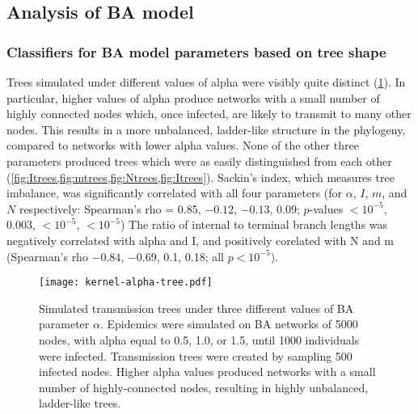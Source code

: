 \subsection{Analysis of \acrlong{BA} model}



\subsubsection*{Classifiers for BA model parameters based on tree shape}



Trees simulated under different values of \gls{alpha} were visibly quite
distinct (\cref{fig:alphatrees}). In particular, higher values of \gls{alpha}
produce networks with a small number of highly connected nodes which, once
infected, are likely to transmit to many other nodes. This results in a more
unbalanced, ladder-like structure in the phylogeny, compared to networks with
lower \gls{alpha} values. None of the other three parameters produced trees
which were as easily distinguished from each other
(\cref{fig:Itrees,fig:mtrees,fig:Ntrees,fig:Itrees}).  Sackin's index, which
measures tree imbalance, was significantly correlated with all four parameters
    (for $\alpha$, $I$, $m$, and $N$ respectively: Spearman's rho =
     0.85,
     \ensuremath{-0.12},
     \ensuremath{-0.13},
     0.09;
     $p$-values
     ${<}10^{-5}$,
     $0.003$,
     ${<}10^{-5}$,
     ${<}10^{-5}$)
The ratio of internal to terminal branch lengths was negatively correlated with
\gls{alpha} and \gls{I}, and positively corelated with \gls{N} and \gls{m}
  (Spearman's rho
    \ensuremath{-0.84},
    \ensuremath{-0.69},
    0.1,
    0.18;
  all $p < 10^{-5}$).

\begin{figure}[ht]
  \centering
  \texttt{[image: kernel-alpha-tree.pdf]}
  \caption[Simulated transmission trees under three different values of BA parameter $\alpha$]{
    Simulated transmission trees under three different values of BA parameter
    $\alpha$. Epidemics were simulated on \gls{BA} networks of 5000 nodes, with
    \gls{alpha} equal to 0.5, 1.0, or 1.5, until 1000 individuals were
    infected. Transmission trees were created by sampling 500 infected nodes.
    Higher \gls{alpha} values produced networks with a small number of
    highly-connected nodes, resulting in highly unbalanced, ladder-like trees.
  }
  \label{fig:alphatrees}
\end{figure}

